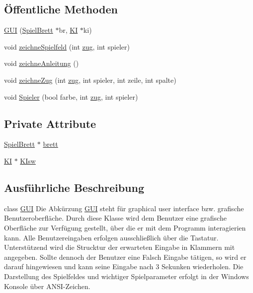 \subsection*{Öffentliche Methoden}
\begin{DoxyCompactItemize}
\item 
\hyperlink{class_g_u_i_abdb64f04f2492fbe458a9585265457ed}{G\+U\+I} (\hyperlink{class_spiel_brett}{Spiel\+Brett} $\ast$br, \hyperlink{class_k_i}{K\+I} $\ast$ki)
\item 
void \hyperlink{class_g_u_i_a3c4186a30634b02fadf9088478fcd6d8}{zeichne\+Spielfeld} (int \hyperlink{structzug}{zug}, int spieler)
\item 
void \hyperlink{class_g_u_i_ab679c856cec515619230cfc070b620a4}{zeichne\+Anleitung} ()
\item 
void \hyperlink{class_g_u_i_ab892cc67dca7bd80350101493dd26542}{zeichne\+Zug} (int \hyperlink{structzug}{zug}, int spieler, int zeile, int spalte)
\item 
void \hyperlink{class_g_u_i_a96e74958db22ad7359287eb2e06d0cb2}{Spieler} (bool farbe, int \hyperlink{structzug}{zug}, int spieler)
\end{DoxyCompactItemize}
\subsection*{Private Attribute}
\begin{DoxyCompactItemize}
\item 
\hyperlink{class_spiel_brett}{Spiel\+Brett} $\ast$ \hyperlink{class_g_u_i_ad27ec30e361c6b18ba0b03f4eb3c2697}{brett}
\item 
\hyperlink{class_k_i}{K\+I} $\ast$ \hyperlink{class_g_u_i_a859788c2a71895514783423c305cf886}{K\+Isw}
\end{DoxyCompactItemize}


\subsection{Ausführliche Beschreibung}
class \hyperlink{class_g_u_i}{G\+U\+I} Die Abkürzung \hyperlink{class_g_u_i}{G\+U\+I} steht für graphical user interface bzw. grafische Benutzeroberfläche. Durch diese Klasse wird dem Benutzer eine grafische Oberfläche zur Verfügung gestellt, über die er mit dem Programm interagierien kann. Alle Benutzereingaben erfolgen ausschließlich über die Tastatur. Unterstützend wird die Strucktur der erwarteten Eingabe in Klammern mit angegeben. Sollte dennoch der Benutzer eine Falsch Eingabe tätigen, so wird er darauf hingewiesen und kann seine Eingabe nach 3 Sekunken wiederholen. Die Darstellung des Spielfeldes und wichtiger Spielparameter erfolgt in der Windows Konsole über A\+N\+S\+I-\/\+Zeichen. 

